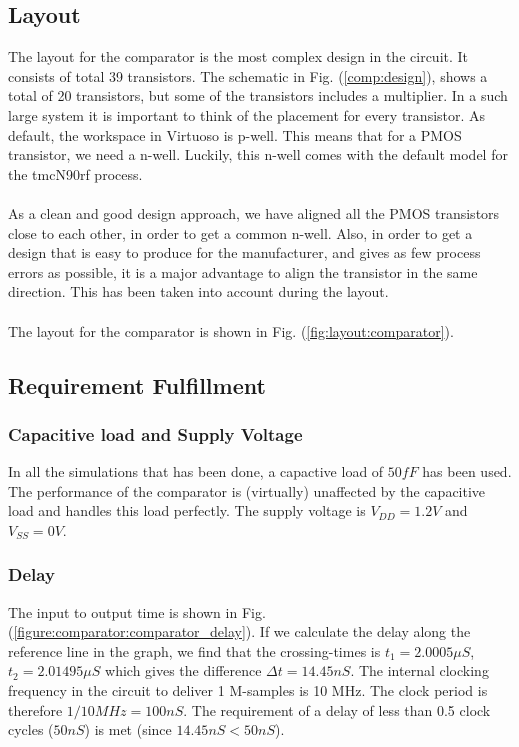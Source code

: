 \documentclass[english, 12pt, a4paper]{ifimaster}
\begin{document}
\subsection{Layout}
The layout for the comparator is the most complex design in the circuit. It consists 
of total 39 transistors. The schematic in Fig. (\ref{comp:design}), shows a total of 20 transistors, but some of the
transistors includes a multiplier. In a such large system it is important to think 
of the placement for every transistor. As default, the workspace in Virtuoso is p-well. 
This means that for a PMOS transistor, we need a n-well. Luckily, this n-well comes 
with the default model for the tmcN90rf process. \\
\\
As a clean and good design approach, we have aligned all the PMOS transistors close 
to each other, in order to get a common n-well. Also, in order to get a design that 
is easy to produce for the manufacturer, and gives as few process errors as 
possible, it is a major advantage to align the transistor in the same direction. 
This has been taken into account during the layout.\\
\\
The layout for the comparator is shown in Fig. (\ref{fig:layout:comparator}). 



\subsection{Requirement Fulfillment}
\subsubsection{Capacitive load and Supply Voltage}
In all the simulations that has been done, a capactive load of \(50 fF\) has been used. The performance of the comparator is (virtually) unaffected by the capacitive load and handles this load perfectly.
The supply voltage is \(V_{DD} = 1.2V\) and \(V_{SS} = 0V\).

\subsubsection{Delay}
The input to output time is shown in Fig. (\ref{figure:comparator:comparator_delay}). 
If we calculate the delay along the reference line in the graph, we find that the crossing-times is \( t_1 = 2.0005\mu S\), \(t_2 = 2.01495\mu S \) which gives the difference \(\Delta t = 14.45nS \).
The internal clocking frequency in the circuit to deliver 1 M-samples is 10 MHz. The clock period is therefore \(1/10MHz = 100nS\). 
The requirement of a delay of less than 0.5 clock cycles (\(50nS\)) is met (since \(14.45nS < 50nS\)).
\end{document}

